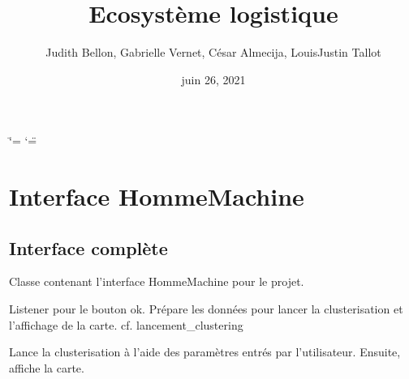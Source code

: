 \documentclass[letterpaper,10pt,french]{sphinxmanual}
\title{Ecosystème logistique}
\date{juin 26, 2021}
\author{Judith Bellon, Gabrielle Vernet, César Almecija, Louis\sphinxhyphen{}Justin Tallot}
\begin{document}
\ifdefined\shorthandoff
  \ifnum\catcode`\=\string=\active\shorthandoff{=}\fi
  \ifnum\catcode`\"=\active{}\fi
\fi

\pagestyle{empty}
\sphinxmaketitle
\pagestyle{plain}
\sphinxtableofcontents
\pagestyle{normal}
\label{\detokenize{index::doc}}



\chapter{Interface Homme\sphinxhyphen{}Machine}
\label{\detokenize{index:interface-homme-machine}}

\section{Interface complète}
\label{\detokenize{index:module-src.ihm.ihm_complet}}\label{\detokenize{index:interface-complete}}

\begin{fulllineitems}
\label{\detokenize{index:src.ihm.ihm_complet.Wind}}
\sphinxAtStartPar
Classe contenant l’interface Homme\sphinxhyphen{}Machine pour le projet.

\begin{fulllineitems}
\label{\detokenize{index:src.ihm.ihm_complet.Wind.appui_bouton_OK}}
\sphinxAtStartPar
Listener pour le bouton ok.
Prépare les données pour lancer la clusterisation et l’affichage de la carte.
cf. lancement\_clustering

\end{fulllineitems}


\begin{fulllineitems}
\label{\detokenize{index:src.ihm.ihm_complet.Wind.lancement_clustering}}
\sphinxAtStartPar
Lance la clusterisation à l’aide des paramètres entrés par l’utilisateur.
Ensuite, affiche la carte.

\end{fulllineitems}


\end{fulllineitems}
\end{document}
